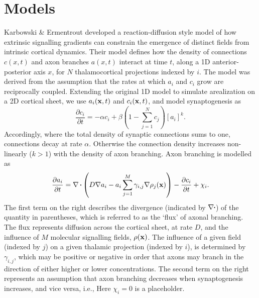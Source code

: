 \documentclass[9pt,lineno]{elife}
\begin{document}
\section{Models}

Karbowski \& Ermentrout \citep{karbowski_model_2004} developed a
reaction-diffusion style model of how extrinsic signalling gradients can
constrain the emergence of distinct fields from intrinsic cortical
dynamics. Their model defines how the density of connections $c(x,t)$ and axon
branches $a(x,t)$ interact at time $t$, along a 1D anterior-posterior axis
$x$, for $N$ thalamocortical projections indexed by $i$. The model was derived
from the assumption that the rates at which $a_i$ and $c_i$ grow are
reciprocally coupled. Extending the original 1D model to simulate arealization
on a 2D cortical sheet, we use $a_i(\mathbf{x},t)$ and $c_i(\mathbf{x},t)$, and model
synaptogenesis as
%
\begin{equation} \label{eq:dc}
\frac{\partial c_i}{\partial t} =-\alpha c_i +\beta  \left(1 - \sum_{j=1}^{N} c_{j}\right)[a_i]^k.
\end{equation}
%
Accordingly, where the total density of synaptic connections sums to one,
connections decay at rate $\alpha$. Otherwise the connection density increases
non-linearly ($k>1$) with the density of axon branching. Axon branching is
modelled as
%
\begin{equation} \label{eq:da}
\frac{\partial a_i}{\partial t} = \nabla\vcdot\left(D \nabla a_i-a_i\sum_{j=1}^{M} \gamma_{i,j}\nabla \rho_j(\mb{x})\right) - \frac{\partial c_i}{\partial t} + \chi_i.
\end{equation}
%
The first term on the right describes the divergence (indicated by
$\nabla\vcdot$) of the quantity in parentheses, which is referred to as the
`flux' of axonal branching. The flux represents diffusion across the cortical
sheet, at rate $D$, and the influence of $M$ molecular signalling fields,
$\rho(\mathbf{x})$. The influence of a given field (indexed by $j$) on a given
thalamic projection (indexed by $i$), is determined by $\gamma_{i,j}$, which
may be positive or negative in order that axons may branch in the direction of
either higher or lower concentrations. The second term on the right represents
an assumption that axon branching decreases when synaptogenesis increases, and
vice versa, i.e., 
Here $\chi_i=0$ is a placeholder.
\end{document}
